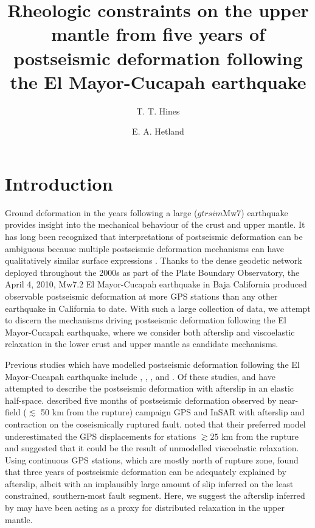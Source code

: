 \documentclass[1p]{elsarticle}
\title{	
Rheologic constraints on the upper mantle from five years of postseismic deformation following the El Mayor-Cucapah earthquake}
\author{T. T. Hines\fnref{fn}}
\author{E. A. Hetland\fnref{fn}}
\begin{document}
\begin{abstract}
\end{abstract}
\maketitle

\section{Introduction}
Ground deformation in the years following a large ($gtrsim$Mw7) earthquake provides insight into the mechanical behaviour of the crust and upper mantle. It has long been recognized that interpretations of postseismic deformation can be ambiguous because multiple postseismic deformation mechanisms can have qualitatively similar surface expressions \citep[e.g.][]{Savage1990}. Thanks to the dense geodetic network deployed throughout the 2000s as part of the Plate Boundary Observatory, the April 4, 2010, Mw7.2 El Mayor-Cucapah earthquake in Baja California produced observable postseismic deformation at more GPS stations than any other earthquake in California to date. With such a large collection of data, we attempt to discern the mechanisms driving postseismic deformation following the El Mayor-Cucapah earthquake, where we consider both afterslip and viscoelastic relaxation in the lower crust and upper mantle as candidate mechanisms. 

Previous studies which have modelled postseismic deformation following the El Mayor-Cucapah earthquake include \citet{Pollitz2012}, \citet{Gonzalez-ortega2014}, \citet{Spinler2015}, and \citet{Rollins2015}. Of these studies, \citet{Gonzalez-ortega2014} and \citet{Rollins2015} have attempted to describe the postseismic deformation with afterslip in an elastic half-space.  \citet{Gonzalez-ortega2014} described five months of postseismic deformation observed by near-field ($\lesssim$ 50 km from the rupture) campaign GPS and InSAR with afterslip and contraction on the coseismically ruptured fault. \citet{Gonzalez-ortega2014} noted that their preferred model underestimated the GPS displacements for stations $\gtrsim 25$ km from the rupture and suggested that it could be the result of unmodelled viscoelastic relaxation.  Using continuous GPS stations, which are mostly north of rupture zone, \citet{Rollins2015} found that three years of postseismic deformation can be adequately explained by afterslip, albeit with an implausibly large amount of slip inferred on the least constrained, southern-most fault segment. Here, we suggest the afterslip inferred by \cite{Rollins2015} may have been acting as a proxy for distributed relaxation in the upper mantle. 
\end{document}
